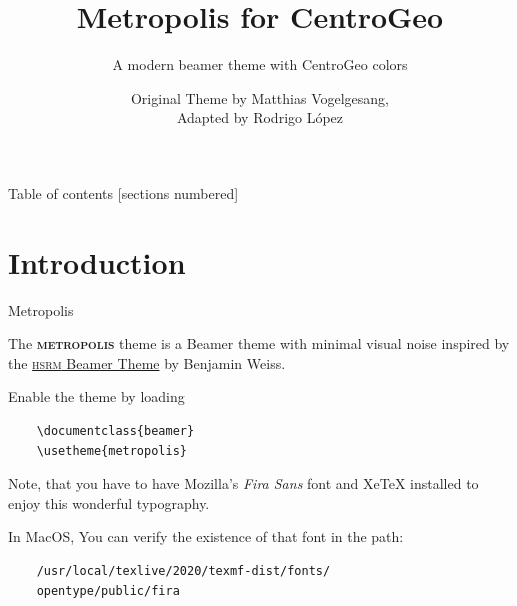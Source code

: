 \documentclass[10pt]{beamer}
\title{Metropolis for CentroGeo}
\subtitle{A modern beamer theme with CentroGeo colors}
\date{}
\author{Original Theme by Matthias Vogelgesang, \\ Adapted by Rodrigo López}
\institute{Centro de Investigación en
Ciencias de Información Geoespacial}
\newcommand{\themename}{\textbf{\textsc{metropolis}}\xspace}
\begin{document}
\maketitle

\begin{frame}{Table of contents}
  [sections numbered]
  \tableofcontents%
\end{frame}



\section[Intro]{Introduction}

\begin{frame}[fragile]{Metropolis}

  The \themename theme is a Beamer theme with minimal visual noise
  inspired by the \href{https://github.com/hsrmbeamertheme/hsrmbeamertheme}{\textsc{hsrm} Beamer
  Theme} by Benjamin Weiss.

  Enable the theme by loading

  \begin{verbatim}    \documentclass{beamer}
    \usetheme{metropolis}\end{verbatim}

  Note, that you have to have Mozilla's \emph{Fira Sans} font and XeTeX
  installed to enjoy this wonderful typography.
  
  In MacOS, You can verify the existence of that font in the path:
    \footnotesize{
    \begin{verbatim}    
    /usr/local/texlive/2020/texmf-dist/fonts/
    opentype/public/fira
    
    \end{verbatim}
    }
  
\end{frame}
\end{document}

